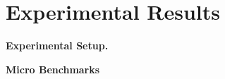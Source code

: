 \section{Experimental Results}

\noindent \textbf{Experimental Setup.} 

\noindent \textbf{Micro Benchmarks} 